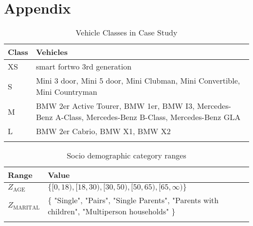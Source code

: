 \clearpage
\section{Appendix}
\label{app:A}

\begin{longtable}{ | l | p{12cm} |}
  \hline
  \textbf{Class} & \textbf{Vehicles} \\
  \hline
  XS & smart fortwo 3rd generation \\
  S & Mini 3 door, Mini 5 door, Mini Clubman, Mini Convertible,  Mini Countryman \\
  M & BMW 2er Active Tourer, BMW 1er, BMW I3, Mercedes-Benz A-Class, Mercedes-Benz B-Class, Mercedes-Benz GLA \\
  L & BMW 2er Cabrio, BMW X1, BMW X2 \\
  \hline

  \caption{Vehicle Classes in Case Study}
  \label{table:VehicleClasses}
\end{longtable}

\begin{longtable}{ | l | p{10cm} |}
  \hline
  \textbf{Range} & \textbf{Value} \\
  \hline
  $Z_{\text{AGE}}$ & $\{ [0, 18), [18, 30), [30, 50), [50, 65), [65, \infty)  \}$ \\
  $Z_{\text{MARITAL}}$ & $\{$ "Single", "Pairs", "Single Parents", "Parents with children", "Multiperson households" $\}$ \\
  \hline

  \caption{Socio demographic category ranges}
  \label{table:Ranges}
\end{longtable}

